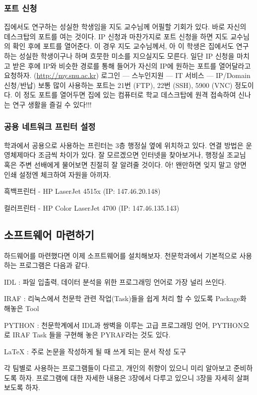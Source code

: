 \subsubsection{포트 신청}
집에서도 연구하는 성실한 학생임을 지도 교수님께 어필할 기회가 있다. 
바로 자신의 데스크탑의 포트를 여는 것이다. IP 신청과 마찬가지로 포트 신청을 하면 지도 교수님의 확인 후에 포트를 열어준다.
이 경우 지도 교수님께서, 아 이 학생은 집에서도 연구하는 성실한 학생이구나 하며 흐뭇한 미소를 지으실지도 모른다.
일단 IP 신청을 마치고 받은 후에 IP와 비슷한 경로를 통해 들어가 자신의 IP에 원하는 포트를 열어달라고 요청하자. 
(\url{http://my.snu.ac.kr}) 로그인 --- 스누인지원 --- IT 서비스 --- IP/Domain 신청/반납)
보통 많이 사용하는 포트는 21번 (FTP), 22번 (SSH), 5900 (VNC) 정도이다. 이 정도 포트를 열어두면 집에 있는 컴퓨터로 학교 데스크탑에 원격 접속하여 신나는 연구 생활을 즐길 수 있다!!! 

\subsubsection{공용 네트워크 프린터 설정}
학과에서 공용으로 사용하는 프린터는 3층 행정실 옆에 위치하고 있다. 연결 방법은 운영체제마다 조금씩 차이가 있다. 잘 모르겠으면 인터넷을 찾아보거나, 행정실 조교님 혹은 주변 선배에게 물어보면 친절히 잘 알려줄 것이다. 아! 왠만하면 잊지 말고 양면 인쇄 설정엔 체크하여 자원을 아끼자. 
\begin{packed_item}
\item 흑백프린터 - HP LaserJet 4515x (IP: 147.46.20.148)
\item 컬러프린터 - HP Color LaserJet 4700 (IP: 147.46.135.143)
\end{packed_item}

\subsection{소프트웨어 마련하기}
하드웨어를 마련했다면 이제 소프트웨어를 설치해보자. 천문학과에서 기본적으로 사용하는 프로그램은 다음과 같다.
\begin{packed_item}
\item IDL : 파일 입출력, 데이터 분석을 위한 프로그래밍 언어로 가장 널리 쓰인다.
\item IRAF : 리눅스에서 천문학 관련 작업(Task)들을 쉽게 처리 할 수 있도록 Package화 해놓은 Tool
\item PYTHON : 천문학계에서 IDL과 쌍벽을 이루는 고급 프로그래밍 언어, PYTHON으로 IRAF Task 들을 구현해 놓은 PYRAF라는 것도 있다.
\item LaTeX : 주로 논문을 작성하게 될 때 쓰게 되는 문서 작성 도구
\end{packed_item}
각 팀별로 사용하는 프로그램들이 다르고, 개인의 취향이 있으니 미리 알아보고 준비하도록 하자. 프로그램에 대한 자세한 내용은 3장에서 다루고 있으니 3장을 자세히 살펴보도록 하자.

